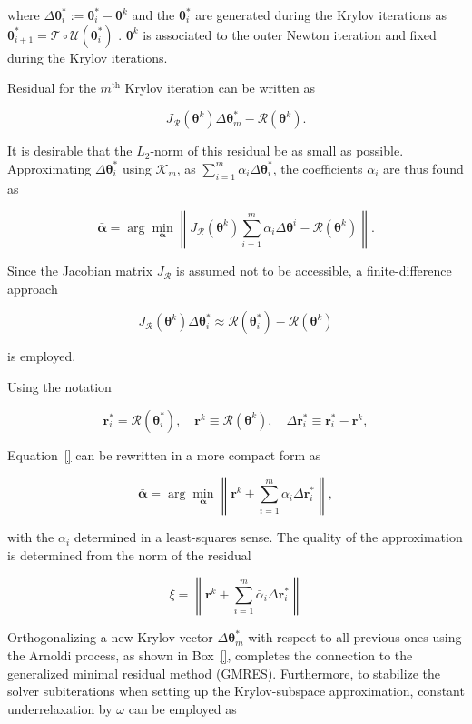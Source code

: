 where $\Delta \boldsymbol{\theta}^*_{i}:=\boldsymbol{\theta}^*_{i}-\boldsymbol{\theta}^{k}$ and the $\boldsymbol{\theta}^*_{i}$ are generated during the Krylov iterations as $\boldsymbol{\theta}^*_{i+1}=\mathcal{T} \circ \mathcal U\left(\boldsymbol{\theta}^*_{i}\right)$ . $\boldsymbol{\theta}^{k}$ is associated to the outer Newton iteration and fixed during the Krylov iterations.

Residual for the $m^\mathrm{th}$ Krylov iteration can be written as

$$
J_\mathcal{R}(\boldsymbol \theta^k)\Delta\boldsymbol \theta^*_m - \mathcal R(\boldsymbol \theta^k).
$$

It is desirable that the $L_2$-norm of this residual be as small as possible. Approximating $\Delta \boldsymbol \theta^*_i$ using $\mathcal K_m$, as $\sum_{i=1}^m \alpha_i \Delta \boldsymbol \theta^*_i$, the coefficients $\alpha_i$ are thus found as

$$
\bar{\boldsymbol \alpha} = \arg\min_{\boldsymbol\alpha} \left\|J_\mathcal{R}(\boldsymbol \theta^k)\sum_{i=1}^m \alpha_i \Delta\boldsymbol \theta^i - \mathcal R(\boldsymbol \theta^k)\right\|.
$$

Since the Jacobian matrix $J_{\mathcal R}$ is assumed not to be accessible, a finite-difference approach

$$
J_{\mathcal{R}}\left(\boldsymbol{\theta}^{k}\right) \Delta \boldsymbol{\theta}^*_{i} \approx \mathcal{R}\left(\boldsymbol{\theta}^*_{i}\right)-\mathcal{R}\left(\boldsymbol{\theta}^{k}\right)
$$

is employed.

Using the notation

$$
\mathbf r^*_i = \mathcal R(\boldsymbol \theta^*_i),\quad
\mathbf r^k \equiv  \mathcal R(\boldsymbol \theta^k),\quad
\Delta \mathbf r_i^* \equiv \mathbf r_i^* - \mathbf r^k,
$$

Equation~\eqref{} can be rewritten in a more compact form as

$$
\bar{\boldsymbol \alpha} = \arg\min_{\boldsymbol \alpha} \left\|\mathbf r^k+\sum_{i=1}^m\alpha_i\Delta\mathbf r^*_i\right\|,
$$

with the $\alpha_i$ determined in a least-squares sense. The quality of the approximation is determined from the norm of the residual

$$
\xi=\left\|\boldsymbol{r}^{k}+\sum_{i=1}^{m} \bar{\alpha}_{i} \Delta \boldsymbol{r}^*_{i}\right\|
$$

Orthogonalizing a new Krylov-vector $\Delta \boldsymbol{\theta}^*_{m}$ with respect to all previous ones using the Arnoldi process, as shown in Box~\ref{}, completes the connection to the generalized minimal residual method (GMRES). Furthermore, to stabilize the solver subiterations when setting up the Krylov-subspace approximation, constant underrelaxation by $\omega$ can be employed as

